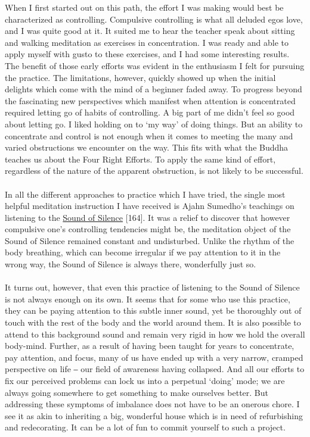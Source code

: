 When I first started out on this path, the effort I was making would
best be characterized as controlling. Compulsive controlling is what all
deluded egos love, and I was quite good at it. It suited me to hear the
teacher speak about sitting and walking meditation as exercises in
concentration. I was ready and able to apply myself with gusto to these
exercises, and I had some interesting results. The benefit of those
early efforts was evident in the enthusiasm I felt for pursuing the
practice. The limitations, however, quickly showed up when the initial
delights which come with the mind of a beginner faded away. To progress
beyond the fascinating new perspectives which manifest when attention is
concentrated required letting go of habits of controlling. A big part of
me didn't feel so good about letting go. I liked holding on to `my way'
of doing things. But an ability to concentrate and control is not enough
when it comes to meeting the many and varied obstructions we encounter
on the way. This fits with what the Buddha teaches us about the Four
Right Efforts. To apply the same kind of effort, regardless of the
nature of the apparent obstruction, is not likely to be successful.\\
~\\
In all the different approaches to practice which I have tried, the
single most helpful meditation instruction I have received is Ajahn
Sumedho's teachings on listening to the
\href{https://forestsangha.org/teachings/books/anthology-vol-4-the-sound-of-silence?language=English}{Sound
of Silence} {[}164{]}. It was a relief to discover that however
compulsive one's controlling tendencies might be, the meditation object
of the Sound of Silence remained constant and undisturbed. Unlike the
rhythm of the body breathing, which can become irregular if we pay
attention to it in the wrong way, the Sound of Silence is always there,
wonderfully just so.\\
~\\
It turns out, however, that even this practice of listening to the Sound
of Silence is not always enough on its own. It seems that for some who
use this practice, they can be paying attention to this subtle inner
sound, yet be thoroughly out of touch with the rest of the body and the
world around them. It is also possible to attend to this background
sound and remain very rigid in how we hold the overall body-mind.
Further, as a result of having been taught for years to concentrate, pay
attention, and focus, many of us have ended up with a very narrow,
cramped perspective on life ‒ our field of awareness having collapsed.
And all our efforts to fix our perceived problems can lock us into a
perpetual `doing' mode; we are always going somewhere to get something
to make ourselves better. But addressing these symptoms of imbalance
does not have to be an onerous chore. I see it as akin to inheriting a
big, wonderful house which is in need of refurbishing and redecorating.
It can be a lot of fun to commit yourself to such a project.

